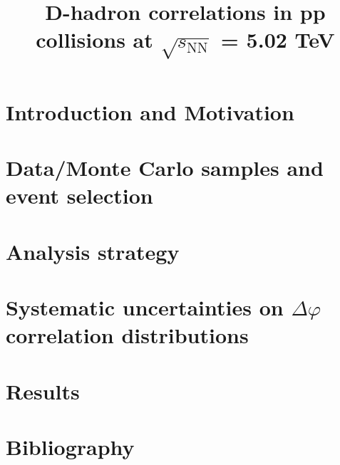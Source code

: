 \documentclass[ALICE,manyauthors]{cernphprep}
\begin{document}
\begin{titlepage}


\PHdate{\today}              

\title{D-hadron correlations  in pp collisions at $\sqrt{s_\mathrm{NN}}$ = 5.02 TeV}

%




\end{titlepage}

\linenumbers
\tableofcontents

\newpage
\section{Introduction and Motivation}


\newpage
\section{Data/Monte Carlo samples and event selection}


\newpage
\section{Analysis strategy}


\newpage
\section{Systematic uncertainties on $\Delta\varphi$ correlation distributions}


\newpage
\section{Results}

\newpage
\section{Bibliography}

\end{document}

